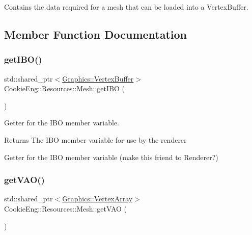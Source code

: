 Contains the data required for a mesh that can be loaded into a Vertex\+Buffer. 

\subsection{Member Function Documentation}
\mbox{\label{struct_cookie_eng_1_1_resources_1_1_mesh_a322630a222821c217f45b38c25fafc3a}} 
\subsubsection{\texorpdfstring{get\+I\+B\+O()}{getIBO()}}
{\footnotesize\ttfamily std\+::shared\+\_\+ptr$<$\hyperlink{class_cookie_eng_1_1_graphics_1_1_vertex_buffer}{Graphics\+::\+Vertex\+Buffer}$>$ Cookie\+Eng\+::\+Resources\+::\+Mesh\+::get\+I\+BO (\begin{DoxyParamCaption}{ }\end{DoxyParamCaption})\hspace{0.3cm}{\ttfamily [inline]}}



Getter for the I\+BO member variable. 

\begin{DoxyReturn}{Returns}
The I\+BO member variable for use by the renderer
\end{DoxyReturn}
Getter for the I\+BO member variable (make this friend to Renderer?) \mbox{\label{struct_cookie_eng_1_1_resources_1_1_mesh_ab61a5cfe63393488dfb17a905e7721d6}} 
\subsubsection{\texorpdfstring{get\+V\+A\+O()}{getVAO()}}
{\footnotesize\ttfamily std\+::shared\+\_\+ptr$<$\hyperlink{class_cookie_eng_1_1_graphics_1_1_vertex_array}{Graphics\+::\+Vertex\+Array}$>$ Cookie\+Eng\+::\+Resources\+::\+Mesh\+::get\+V\+AO (\begin{DoxyParamCaption}{ }\end{DoxyParamCaption})\hspace{0.3cm}{\ttfamily [inline]}}




